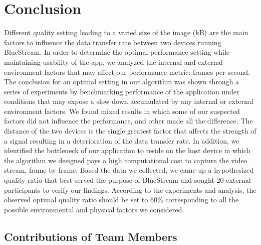 \documentclass[a4paper,12pt]{article}
\begin{document}
\section{Conclusion}
Different quality setting leading to a varied size of the image (kB) are the main factors to influence the data transfer rate between two devices running BlueStream. In order to determine the optimal performance setting while maintaining usability of the app, we analyzed the internal and external environment factors that may affect our performance metric: frames per second. The conclusion for an optimal setting in our algorithm was shown through a series of experiments by benchmarking performance of the application under conditions that may expose a slow down accumulated by any internal or external environment factors. We found mixed results in which some of our suspected factors did not influence the performance, and other made all the difference. The distance of the two devices is the single greatest factor that affects the strength of a signal  resulting in a deterioration of the data transfer rate. In addition, we identified the bottleneck of our application to reside on the host device in which the algorithm we designed pays a high computational cost to capture the video stream, frame by frame. Based the data we collected, we came up a hypothesized quality ratio that best served the purpose of BlueStream and sought 20 external participants to verify our findings. According to the experiments and analysis, the observed optimal quality ratio should be set to 60\% corresponding to all the possible environmental and physical factors we considered.

\subsection{Contributions of Team Members}
\end{document}
